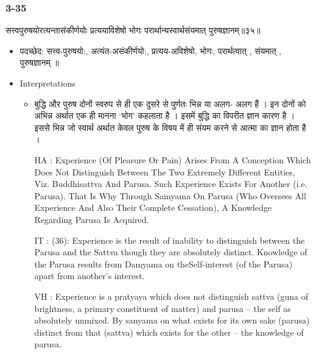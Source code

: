 \begin{frame}[fragile]\frametitle{3-35}
\begin{sanskrit}
सत्त्वपुरुषयोरत्यन्तासंकीर्णयोः प्रत्ययाविशेषो भोगः परार्थान्यस्वार्थसंयमात् पुरुषज्ञानम्॥३५॥
\end{sanskrit}

	\begin{itemize}
	\item पदच्छेद:  सत्त्व-पुरुषयो:, अत्यंत-असंकीर्णयो:, प्रत्यय-अविशेषो, भोगः, परार्थत्वात् , संयमात् , पुरुषज्ञानम् ॥
	\item Interpretations
		\begin{itemize}	
		\item बुद्धि और पुरुष दोनों स्वरुप से ही एक दुसरे से पुर्णतः भिन्न या अलग- अलग हैं । इन दोनों को अभिन्न अर्थात एक ही मानना ‘भोग’ कहलाता है । इसमें बुद्धि का विपरीत ज्ञान कारण है । इससे भिन्न जो स्वार्थ अर्थात केवल पुरुष के विषय में ही संयम करने से आत्मा का ज्ञान होता है ।
		\item [HA]: Experience (Of Pleasure Or Pain) Arises From A Conception Which Does Not Distinguish Between The Two Extremely Different Entities, Viz. Buddhisattva And Parusa. Such Experience Exists For Another (i.e. Parusa). That Is Why Through Samyama On Parusa (Who Oversees All Experience And Also Their Complete Cessation), A Knowledge Regarding Parusa Is Acquired.
		\item [IT]: (36): Experience is the result of inability to distinguish between the Parusa and the Sattva though they are absolutely distinct. Knowledge of the Parusa results from Damyama on theSelf-interest (of the Parusa) apart from another’s interest.
		\item [VH]: Experience is a pratyaya which does not distinguish sattva (guna of brightness, a primary constituent of matter) and parusa – the self as absolutely unmixed. By sanyama on what exists for its own sake (parusa) distinct from that (sattva) which exists for the other – the knowledge of parusa.		
		\end{itemize}
	\end{itemize}
\end{frame}


